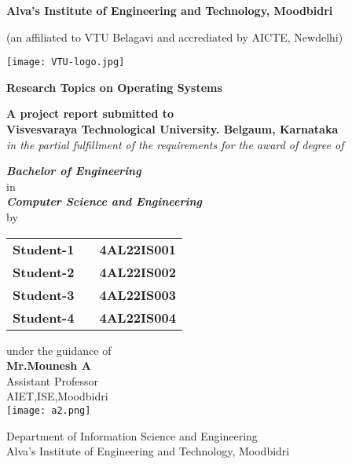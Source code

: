 \documentclass{article}
\begin{document}
\begin{center}
 \LARGE \bfseries{Alva's Institute of Engineering and Technology, Moodbidri}
 
 \begin{small}
 (an affiliated to VTU Belagavi and accrediated by AICTE, Newdelhi)
 
 \vspace{1cm}
 \texttt{[image: VTU-logo.jpg]}
 \end{small}
 \vspace{1cm}
 \Large \bfseries{Research Topics on Operating Systems}
\end{center} 
\begin{center}
 \vspace*{1.2cm}
 \noindent \textbf{A project report submitted to \\Visvesvaraya Technological 
University. Belgaum, Karnataka }\\
 \textit{in the partial fulfillment of the requirements for the award of degree of} \\
 
 \begin{normalsize}
\textbf{\textit{Bachelor of Engineering }} \\
in \\
\textbf{\textit{Computer Science and Engineering}} \\
by \\
\end{normalsize}
 
 
\begin{tabular}{ccc}
\textbf{Student-1 }& & \textbf{4AL22IS001}\\
\textbf{Student-2 }& & \textbf{4AL22IS002}\\
\textbf{Student-3 }& & \textbf{4AL22IS003}\\
\textbf{Student-4 }& & \textbf{4AL22IS004}\\
\end{tabular}
\vfill
{\normalsize under the guidance of}\\
\Large{\textbf{Mr.Mounesh A}}\\
Assistant Professor\\
AIET,ISE,Moodbidri\\
 
 \texttt{[image: a2.png]}
 
 Department of Information Science and Engineering\\
 Alva's Institute of Engineering and Technology, Moodbidri 
\end{center}
\end{document}
